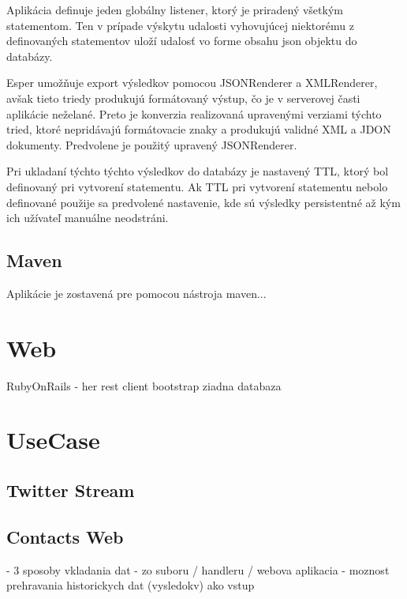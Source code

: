 		Aplikácia definuje jeden globálny listener, ktorý je priradený všetkým statementom. Ten v prípade výskytu udalosti vyhovujúcej niektorému z definovaných statementov uloží udalosť vo forme obsahu json objektu do databázy.
		
		Esper umožňuje export výsledkov pomocou JSONRenderer a XMLRenderer, avšak tieto triedy produkujú formátovaný výstup, čo je v serverovej časti aplikácie neželané. Preto je konverzia realizovaná upravenými verziami týchto tried, ktoré nepridávajú formátovacie znaky a produkujú validné XML a JDON dokumenty. Predvolene je použitý upravený JSONRenderer.
		
		Pri ukladaní týchto týchto výsledkov do databázy je nastavený TTL, ktorý bol definovaný pri vytvorení statementu. Ak TTL pri vytvorení statementu nebolo definované použije sa predvolené nastavenie, kde sú výsledky persistentné až kým ich užívateľ manuálne neodstráni.

	\subsection{Maven}
		Aplikácie je zostavená pre pomocou nástroja maven...
		

\section{Web}
	RubyOnRails - her rest client
	bootstrap
	ziadna databaza
	
\section{UseCase}
	\subsection{Twitter Stream}
	\subsection{Contacts Web}
		
- 3 sposoby vkladania dat - zo suboru / handleru / webova aplikacia
- moznost prehravania historickych dat (vysledokv) ako vstup